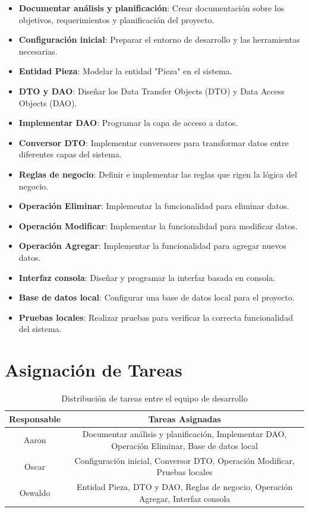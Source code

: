 \begin{itemize}
    \item \textbf{Documentar análisis y planificación}: Crear documentación sobre los objetivos, requerimientos y planificación del proyecto.
    \item \textbf{Configuración inicial}: Preparar el entorno de desarrollo y las herramientas necesarias.
    \item \textbf{Entidad Pieza}: Modelar la entidad "Pieza" en el sistema.
    \item \textbf{DTO y DAO}: Diseñar los Data Transfer Objects (DTO) y Data Access Objects (DAO).
    \item \textbf{Implementar DAO}: Programar la capa de acceso a datos.
    \item \textbf{Conversor DTO}: Implementar conversores para transformar datos entre diferentes capas del sistema.
    \item \textbf{Reglas de negocio}: Definir e implementar las reglas que rigen la lógica del negocio.
    \item \textbf{Operación Eliminar}: Implementar la funcionalidad para eliminar datos.
    \item \textbf{Operación Modificar}: Implementar la funcionalidad para modificar datos.
    \item \textbf{Operación Agregar}: Implementar la funcionalidad para agregar nuevos datos.
    \item \textbf{Interfaz consola}: Diseñar y programar la interfaz basada en consola.
    \item \textbf{Base de datos local}: Configurar una base de datos local para el proyecto.
    \item \textbf{Pruebas locales}: Realizar pruebas para verificar la correcta funcionalidad del sistema.
\end{itemize}

\section{Asignación de Tareas}

\begin{table}[h]
    \centering
    \begin{tabular}{|c|c|}
        \hline
        \textbf{Responsable} & \textbf{Tareas Asignadas} \\
        \hline
        Aaron & Documentar análisis y planificación, Implementar DAO, Operación Eliminar, Base de datos local \\
        \hline
        Oscar & Configuración inicial, Conversor DTO, Operación Modificar, Pruebas locales \\
        \hline
        Oswaldo & Entidad Pieza, DTO y DAO, Reglas de negocio, Operación Agregar, Interfaz consola \\
        \hline
    \end{tabular}
    \caption{Distribución de tareas entre el equipo de desarrollo}
\end{table}



